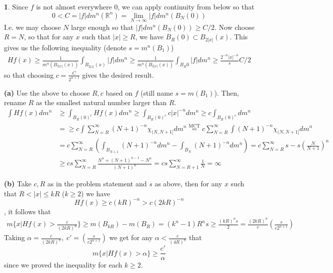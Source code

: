 \documentclass[10.5pt]{article}
\theoremstyle{definition}
\newtheorem{pb}{}
\newcommand{\set}[1]{\{#1\}}
\newcommand{\abs}[1]{\left\vert#1\right\vert}
\begin{document}
    \begin{pb}
        Since \(f\) is not almost everywhere 0, we can apply continuity from below so that 
        \[0 < C = \abs{f} dm^n (\mathbb{R}^n) = \lim_{N\to\infty}\abs{f} dm^n (B_N(0))\]
        I.e. we may choose \(N\) large enough so that \(\abs{f} dm^n (B_N(0)) \geq C/2\).
        Now choose \(R = N\), so that for any \(x\) such that \(\abs{x} \geq R\), we have \(B_R(0) \subset B_{2\abs{x}}(x)\). This gives us the following inequality (denote \(s = m^n(B_1)\))
        \begin{align*}
            Hf(x) \geq \frac{1}{m^n(B_{2\abs{x}}(x))}\int_{B_{2\abs{x}}(x)} \abs{f} dm^n \geq \frac{1}{m^n(B_{2\abs{x}}(x))} \int_{B_R{0}} \abs{f} dm^n
            \geq \frac{2^{-n}\abs{x}^{-n}}{s} C/2
        \end{align*}
        so that choosing \(c = \frac{C}{2^{n+1}}\) gives the desired result.

        \textbf{(a)} Use the above to choose \(R,c\) based on \(f\) (still name \(s = m(B_1)\)). Then, rename \(R\) as the smallest natural number larger than \(R\).
        \begin{align*}
            \int Hf(x) dm^n &\geq \int_{B_R(0)^c} Hf(x) dm^n \geq \int_{B_R(0)^c} c\abs{x}^{-n} dm^n \geq c\int_{B_R(0)^c} dm^n \\
            &= \geq c\int \sum_{N=R}^\infty (N+1)^{-n}\chi_{(N,N+1]} dm^n \overset{\text{MCT}}{=} c\sum_{N=R}^\infty \int (N+1)^{-n}\chi_{(N,N+1]} dm^n \\
            &= c\sum_{N=R}^\infty \left(\int_{B_{N+1}} (N+1)^{-n} dm^n - \int_{B_{N}} (N+1)^{-n} dm^n \right) = c\sum_{N=R}^\infty s - s\left(\frac{N}{N+1}\right)^n \\
            &\geq cs\sum_{N=R}^\infty \frac{N^n + (N+1)^{n-1} - N^n}{(N+1)^n} = cs\sum_{N=R+1}^\infty \frac{1}{N} = \infty
        \end{align*}

        \textbf{(b)} Take \(c,R\) as in the problem statement and \(s\) as above, then for any \(x\) such that \(R < \abs{x} \leq kR\) (\(k \geq 2\)) we have \[Hf(x) \geq c(kR)^{-n} > c(2kR)^{-n}\], it follows that
        \begin{align*}
            m\set{x\vert Hf(x) > \frac{c}{(2kR)^n}} \geq m(B_{kR}) - m(B_R) = (k^n-1)R^ns
            \geq \frac{(kR)^ns}{2} = \frac{(2kR)^n}{c}\left(\frac{s}{c2^{n+1}}\right)
        \end{align*}
        Taking \(\alpha = \frac{c}{(2kR)^n}, \; c' = \left(\frac{s}{c2^{n+1}}\right)\) we get for any
        \(\alpha < \frac{c}{(4R)^n}\) that
        \[m\set{x\vert Hf(x) > \alpha} \geq \frac{c'}{\alpha}\]
        since we proved the inequality for each \(k \geq 2\).
    \end{pb}
\end{document}
